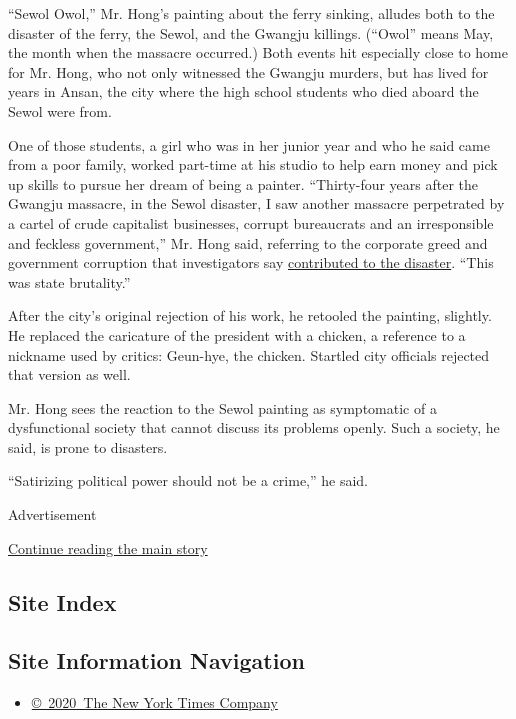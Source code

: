 ``Sewol Owol,'' Mr. Hong's painting about the ferry sinking, alludes
both to the disaster of the ferry, the Sewol, and the Gwangju killings.
(``Owol'' means May, the month when the massacre occurred.) Both events
hit especially close to home for Mr. Hong, who not only witnessed the
Gwangju murders, but has lived for years in Ansan, the city where the
high school students who died aboard the Sewol were from.

One of those students, a girl who was in her junior year and who he said
came from a poor family, worked part-time at his studio to help earn
money and pick up skills to pursue her dream of being a painter.
``Thirty-four years after the Gwangju massacre, in the Sewol disaster, I
saw another massacre perpetrated by a cartel of crude capitalist
businesses, corrupt bureaucrats and an irresponsible and feckless
government,'' Mr. Hong said, referring to the corporate greed and
government corruption that investigators say
\href{http://www.nytimes.com/2014/07/27/world/asia/in-ferry-deaths-a-south-korean-tycoons-downfall.html}{contributed
to the disaster}. ``This was state brutality.''

After the city's original rejection of his work, he retooled the
painting, slightly. He replaced the caricature of the president with a
chicken, a reference to a nickname used by critics: Geun-hye, the
chicken. Startled city officials rejected that version as well.

Mr. Hong sees the reaction to the Sewol painting as symptomatic of a
dysfunctional society that cannot discuss its problems openly. Such a
society, he said, is prone to disasters.

``Satirizing political power should not be a crime,'' he said.

Advertisement

\protect\hyperlink{after-bottom}{Continue reading the main story}

\hypertarget{site-index}{%
\subsection{Site Index}\label{site-index}}

\hypertarget{site-information-navigation}{%
\subsection{Site Information
Navigation}\label{site-information-navigation}}

\begin{itemize}
\tightlist
\item
  \href{https://help.nytimes.com/hc/en-us/articles/115014792127-Copyright-notice}{©~2020~The
  New York Times Company}
\end{itemize}

